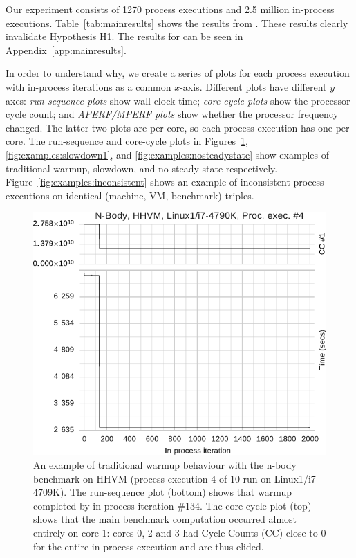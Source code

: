 \documentclass[preprint,numbers,10pt]{sigplanconf}
\newcommand{\bencherthree}{Linux1/i7-4709K\xspace}
\begin{document}
%

Our experiment consists of 1270 process executions and 2.5 million in-process
executions. Table~\ref{tab:mainresults} shows the results from .
 These results
clearly invalidate Hypothesis H1. The results for 
can be seen in Appendix~\ref{app:mainresults}. 

In order to understand why, we create a series of plots for each process execution
with in-process iterations as a common $x$-axis. Different plots have different $y$
axes: \emph{run-sequence plots} show wall-clock time; \emph{core-cycle plots}
show the processor cycle count; and \emph{APERF/MPERF plots} show whether
the processor frequency changed. The latter two plots are per-core, so each process execution
has one per core. The run-sequence and core-cycle plots in Figures~\ref{fig:examples:trad}, \ref{fig:examples:slowdown1},
and \ref{fig:examples:nosteadystate} show examples of traditional warmup, slowdown,
and no steady state respectively. Figure~\ref{fig:examples:inconsistent} shows
an example of inconsistent process executions on identical (machine, VM,
benchmark) triples.

\begin{figure}[t]
\centering
\includegraphics[width=.45\textwidth]{examples/new_warmup_no_migrate.pdf}
\caption{An example of traditional warmup behaviour with the n-body benchmark on
HHVM (process execution 4 of 10 run on \bencherthree). The run-sequence plot
(bottom) shows that warmup completed by in-process iteration \#134. The
core-cycle plot (top) shows that the main benchmark computation
occurred almost entirely on core 1: cores 0, 2 and 3 had Cycle Counts (CC) close
to 0 for the entire in-process execution and are thus elided.}
\label{fig:examples:trad}
\end{figure}
\end{document}
